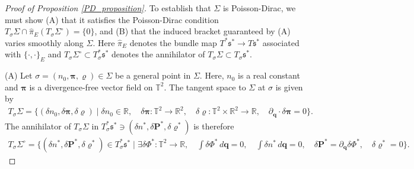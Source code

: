 \documentclass[10pt,a4paper]{amsart}
\begin{document}
\begin{proof}[Proof of Proposition \ref{PD_proposition}]
To establish that $\Sigma$ is Poisson-Dirac, we must show (A) that it satisfies the Poisson-Dirac condition $T_\sigma \Sigma \cap \widehat{\pi}_E(T_\sigma\Sigma^\circ) = \{0\}$, and (B) that the induced bracket guaranteed by (A) varies smoothly along $\Sigma$. Here $\widehat{\pi}_E$ denotes the bundle map $T^*\mathfrak{s}^*\rightarrow T\mathfrak{s}^*$ associated with $\{\cdot,\cdot\}_E$ and $T_\sigma\Sigma^\circ\subset T^*_\sigma\mathfrak{s}^*$ denotes the annihilator of $T_\sigma\Sigma\subset T_\sigma\mathfrak{s}^*$. 

(A) Let $\sigma = (n_0,\bm{\pi},\varrho)\in\Sigma$ be a general point in $\Sigma$. Here, $n_0$ is a real constant and $\bm{\pi}$ is a divergence-free vector field on $\mathbb{T}^2$. The tangent space to $\Sigma$ at $\sigma$ is given by 
\begin{align*}
T_\sigma\Sigma = \{(\delta n_0,\delta\bm{\pi},\delta\varrho)\mid \delta n_0\in \mathbb{R},\quad \delta\bm{\pi}:\mathbb{T}^2\rightarrow\mathbb{R}^2,\quad \delta\varrho:\mathbb{T}^2\times \mathbb{R}^2\rightarrow\mathbb{R}, \quad \partial_{\bm{q}}\cdot\delta\bm{\pi} = 0\}.
\end{align*}
The annihilator of $T_\sigma\Sigma$ in $T^*_\sigma\mathfrak{s}^*\ni (\delta n^*,\delta\bm{P}^*,\delta\varrho^*)$ is therefore
\begin{align*}
T_\sigma\Sigma^\circ = \{(\delta n^*,\delta\bm{P}^*,\delta\varrho^*)\in T^*_\sigma\mathfrak{s}^*\mid \exists\delta\Phi^*:\mathbb{T}^2\rightarrow\mathbb{R},\quad\int\delta\Phi^*\,d\bm{q} = 0,\quad \int \delta n^*\,d\bm{q} = 0,\quad \delta\bm{P}^* =\partial_{\bm{q}}\delta\Phi^*,\quad \delta\varrho^* = 0\}.
\end{align*}

\end{proof}
\end{document}
